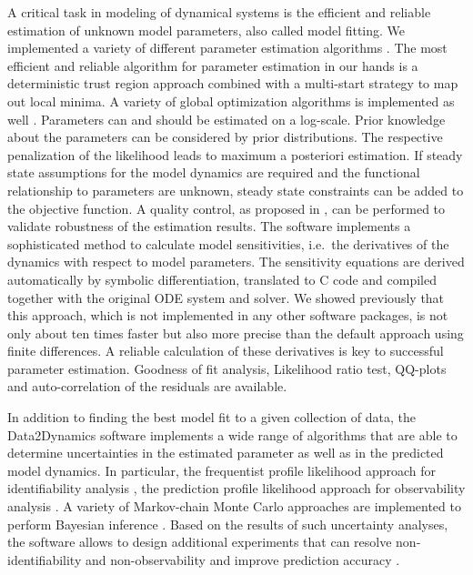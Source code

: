 \documentclass{bioinfo}
\begin{document}
A critical task in modeling of dynamical systems is the efficient and reliable estimation of 
unknown model parameters, also called model fitting. 
We implemented a variety of different 
parameter estimation algorithms \citep{Raue:2012zt}. The most efficient and reliable 
algorithm for parameter estimation in our hands is a deterministic trust region approach 
combined with a multi-start strategy to map out local minima. 
{\color{red} A variety of global optimization algorithms is implemented as well \citep{Kronfeld:2010fk}.} 
Parameters can and should 
be estimated on a log-scale. Prior knowledge about the parameters can be considered 
{\color{red} by prior distributions. The respective penalization of the likelihood leads to 
maximum a posteriori estimation.} 
If steady state assumptions for the model dynamics are required and the functional 
relationship to parameters are unknown, steady state constraints can be added to the 
objective function. A quality control, as proposed in 
\citet{Raue:2012zt}, can be performed to validate robustness of the estimation results. The 
software implements a sophisticated method to calculate model sensitivities, i.e.~the 
derivatives of the dynamics with respect to model parameters. The sensitivity equations 
are derived automatically by symbolic differentiation, translated to C code and compiled 
together with the original ODE system and solver. We showed previously 
\citep{Raue:2012zt} that this approach{\color{red}, which is not implemented in any other software packages, } is not only about ten times faster but also more 
precise than the default approach using finite differences. A reliable calculation of these 
derivatives is key to successful parameter estimation. 
{\color{red} Goodness of fit analysis, Likelihood ratio test, QQ-plots and auto-correlation 
of the residuals are available.} 

In addition to finding the best model fit to a given collection of data, the Data2Dynamics 
software implements a wide range of algorithms that are able to determine uncertainties 
in the estimated parameter as well as in the predicted model dynamics. In particular, the 
frequentist profile likelihood approach for identifiability analysis \citep{Raue:2009ec}, the 
prediction profile likelihood approach for observability analysis \citep{Kreutz:2011kx}{\color{red}.
A variety of Markov-chain Monte Carlo approaches are implemented to perform Bayesian inference \citep{Raue:2013fk, Hug:2012fk}.} Based on the results of such uncertainty 
analyses, the software allows to design additional experiments \citep{Steiert:2012fk} that 
can resolve non-identifiability and non-observability \citep{Raue:2010fk} 
and improve prediction accuracy \citep{Kreutz:2013uq}.
\end{document}
